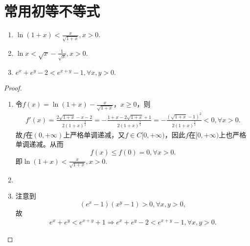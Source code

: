 \documentclass[../../main.tex]{subfiles}
\begin{document}
\section{常用初等不等式}

\begin{proposition}[常用不等式]\label{proposition:常用不等式}
\begin{enumerate}[(1)]
\item\label{proposition:常用不等式1} $\ln \left( 1+x \right) <\frac{x}{\sqrt{1+x}},x>0.$

\item \label{proposition:常用不等式2} $\ln x<\sqrt{x}-\frac{1}{\sqrt{x}},x>0.$

\item \label{proposition:常用不等式3} $e^x+e^y-2<e^{x+y}-1,\forall x,y>0.$
\end{enumerate}
\end{proposition}
\begin{proof}
\begin{enumerate}[(1)]
\item 令\(f(x)=\ln(1 + x)-\frac{x}{\sqrt{1 + x}}\)，\(x\geqslant 0\)，则
\begin{align*}
f'\left( x \right) =\frac{2\sqrt{1+x}-x-2}{2\left( 1+x \right) ^{\frac{3}{2}}}=-\frac{1+x-2\sqrt{1+x}+1}{2\left( 1+x \right) ^{\frac{3}{2}}}=-\frac{\left( \sqrt{1+x}-1 \right) ^2}{2\left( 1+x \right) ^{\frac{3}{2}}}<0,\forall x>0.
\end{align*}
故\(f\)在\((0,+\infty)\)上严格单调递减，又\(f\in C[0,+\infty)\)，因此\(f\)在\([0,+\infty)\)上也严格单调递减。从而
\[
f(x)\leqslant f(0)=0,\forall x>0.
\]
即\(\ln(1 + x)<\frac{x}{\sqrt{1 + x}},x>0\).

\item 

\item 注意到
\[
(e^x-1)(x^y-1)>0,\forall x,y>0,
\]
故
\begin{align*}
e^x+e^y<e^{x+y}+1\Longrightarrow e^x+e^y-2<e^{x+y}-1,\forall x,y>0.
\end{align*}
\end{enumerate}
\end{proof}
\end{document}
